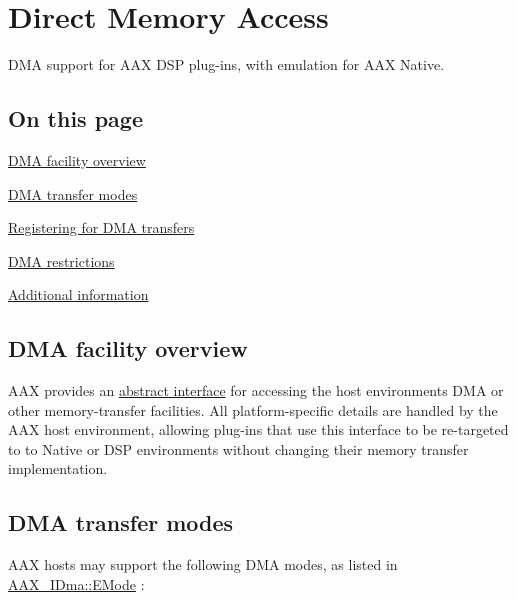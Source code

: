\hypertarget{a00340}{}\section{Direct Memory Access}
\label{a00340}
D\+M\+A support for A\+A\+X D\+S\+P plug-\/ins, with emulation for A\+A\+X Native. 

\hypertarget{a00340_algdmapagecontents}{}\subsection{On this page}\label{a00340_algdmapagecontents}
\begin{DoxyItemize}
\item \hyperlink{a00340_alg_dma_overview}{D\+M\+A facility overview} \item \hyperlink{a00340_alg_dma_modes}{D\+M\+A transfer modes} \item \hyperlink{a00340_alg_dma_registration}{Registering for D\+M\+A transfers} \item \hyperlink{a00340_alg_dma_restrictions}{D\+M\+A restrictions} \item \hyperlink{a00340_alg_dma_additionalinformation}{Additional information}\end{DoxyItemize}
\hypertarget{a00340_alg_dma_overview}{}\subsection{D\+M\+A facility overview}\label{a00340_alg_dma_overview}
A\+A\+X provides an \hyperlink{a00095}{abstract interface} for accessing the host environment\textquotesingle{}s D\+M\+A or other memory-\/transfer facilities. All platform-\/specific details are handled by the A\+A\+X host environment, allowing plug-\/ins that use this interface to be re-\/targeted to to Native or D\+S\+P environments without changing their memory transfer implementation.\hypertarget{a00340_alg_dma_modes}{}\subsection{D\+M\+A transfer modes}\label{a00340_alg_dma_modes}
A\+A\+X hosts may support the following D\+M\+A modes, as listed in \hyperlink{a00095_af8d0f19f2896dd6dbd126b919b24e39b}{A\+A\+X\+\_\+\+I\+Dma\+::\+E\+Mode} \+:

